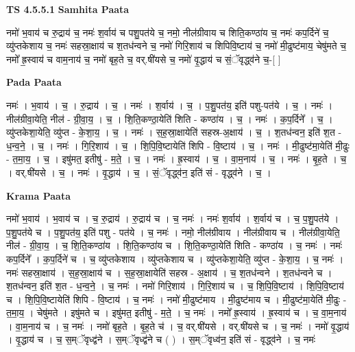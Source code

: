 \documentclass[17pt]{extarticle}
\begin{document}
\textbf{TS 4.5.5.1 } \newline
\textbf{Samhita Paata} \newline

नमो॑ भ॒वाय॑ च रु॒द्राय॑ च॒ नमः॑ श॒र्वाय॑ च पशु॒पत॑ये च॒ नमो॒ नील॑ग्रीवाय च शिति॒कण्ठा॑य च॒ नमः॑ कप॒र्दिने॑ च॒ व्यु॑प्तकेशाय च॒ नमः॑ सहस्रा॒क्षाय॑ च श॒तध॑न्वने च॒ नमो॑ गिरि॒शाय॑ च शिपिवि॒ष्टाय॑ च॒ नमो॑ मी॒ढुष्ट॑माय॒ चेषु॑मते च॒ नमो᳚ ह्र॒स्वाय॑ च वाम॒नाय॑ च॒ नमो॑ बृह॒ते च॒ वर्.षी॑यसे च॒ नमो॑ वृ॒द्धाय॑ च सं॒ॅवृद्ध्व॑ने च॒-[  ] \newline

\textbf{Pada Paata} \newline

नमः॑ । भ॒वाय॑ । च॒ । रु॒द्राय॑ । च॒ । नमः॑ । श॒र्वाय॑ । च॒ । प॒शु॒पत॑य॒ इति॑ पशु-पत॑ये । च॒ । नमः॑ । नील॑ग्रीवा॒येति॒ नील॑ - ग्री॒वा॒य॒ । च॒ । शि॒ति॒कण्ठा॒येति॑ शिति - कण्ठा॑य । च॒ । नमः॑ । क॒प॒र्दिने᳚ । च॒ । व्यु॑प्तकेशा॒येति॒ व्यु॑प्त - के॒शा॒य॒ । च॒ । नमः॑ । स॒ह॒स्रा॒क्षायेति॑ सहस्र-अ॒क्षाय॑ । च॒ । श॒तध॑न्वन॒ इति॑ श॒त - ध॒न्व॒ने॒ । च॒ । नमः॑ । गि॒रि॒शाय॑ । च॒ । शि॒पि॒वि॒ष्टायेति॑ शिपि - वि॒ष्टाय॑ । च॒ । नमः॑ । मी॒ढुष्ट॑मा॒येति॑ मी॒ढुः - त॒मा॒य॒ । च॒ । इषु॑मत॒ इतीषु॑ - म॒ते॒ । च॒ । नमः॑ । ह्र॒स्वाय॑ । च॒ । वा॒म॒नाय॑ । च॒ । नमः॑ । बृ॒ह॒ते । च॒ । वर्.षी॑यसे । च॒ । नमः॑ । वृ॒द्धाय॑ । च॒ । सं॒ॅवृद्ध्व॑न॒ इति॑ सं - वृद्ध्व॑ने । च॒ ।  \newline


\textbf{Krama Paata} \newline

नमो॑ भ॒वाय॑ । भ॒वाय॑ च । च॒ रु॒द्राय॑ । रु॒द्राय॑ च । च॒ नमः॑ । नमः॑ श॒र्वाय॑ । श॒र्वाय॑ च । च॒ प॒शु॒पत॑ये । प॒शु॒पत॑ये च । प॒शु॒पत॑य॒ इति॑ पशु - पत॑ये । च॒ नमः॑ । नमो॒ नील॑ग्रीवाय । नील॑ग्रीवाय च । नील॑ग्रीवा॒येति॒ नील॑ - ग्री॒वा॒य॒ । च॒ शि॒ति॒कण्ठा॑य । शि॒ति॒कण्ठा॑य च । शि॒ति॒कण्ठा॒येति॑ शिति - कण्ठा॑य । च॒ नमः॑ । नमः॑ कप॒र्दिने᳚ । क॒प॒र्दिने॑ च । च॒ व्यु॑प्तकेशाय । व्यु॑प्तकेशाय च । व्यु॑प्तकेशा॒येति॒ व्यु॑प्त - के॒शा॒य॒ । च॒ नमः॑ । नमः॑ सहस्रा॒क्षाय॑ । स॒ह॒स्रा॒क्षाय॑ च । स॒ह॒स्रा॒क्षायेति॑ सहस्र - अ॒क्षाय॑ । च॒ श॒तध॑न्वने । श॒तध॑न्वने च । श॒तध॑न्वन॒ इति॑ श॒त - ध॒न्व॒ने॒ । च॒ नमः॑ । नमो॑ गिरि॒शाय॑ । गि॒रि॒शाय॑ च । च॒ शि॒पि॒वि॒ष्टाय॑ । शि॒पि॒वि॒ष्टाय॑ च । शि॒पि॒वि॒ष्टायेति॑ शिपि - वि॒ष्टाय॑ । च॒ नमः॑ । नमो॑ मी॒ढुष्ट॑माय । मी॒ढुष्ट॑माय च । मी॒ढुष्ट॑मा॒येति॑ मी॒ढुः - त॒मा॒य॒ । चेषु॑मते । इषु॑मते च । इषु॑मत॒ इतीषु॑ - म॒ते॒ । च॒ नमः॑ । नमो᳚ ह्र॒स्वाय॑ । ह्र॒स्वाय॑ च । च॒ वा॒म॒नाय॑ । वा॒म॒नाय॑ च । च॒ नमः॑ । नमो॑ बृह॒ते । बृ॒ह॒ते च॑ । च॒ वर्.षी॑यसे । वर्.षी॑यसे च । च॒ नमः॑ । नमो॑ वृ॒द्धाय॑ । वृ॒द्धाय॑ च । च॒ स॒म्ॅवृध्द्व॑ने । स॒म्ॅवृध्द्व॑ने च ( ) । स॒म्ॅवृध्व॑न॒ इति॑ सं - वृद्ध्व॑ने । च॒ नमः॑ \newline
\end{document}
